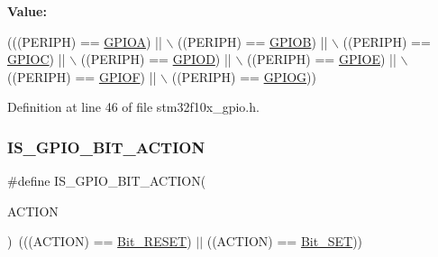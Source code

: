 {\bfseries Value\+:}
\begin{DoxyCode}
(((PERIPH) == \hyperlink{group___peripheral__declaration_gac485358099728ddae050db37924dd6b7}{GPIOA}) || \(\backslash\)
                                    ((PERIPH) == \hyperlink{group___peripheral__declaration_ga68b66ac73be4c836db878a42e1fea3cd}{GPIOB}) || \(\backslash\)
                                    ((PERIPH) == \hyperlink{group___peripheral__declaration_ga2dca03332d620196ba943bc2346eaa08}{GPIOC}) || \(\backslash\)
                                    ((PERIPH) == \hyperlink{group___peripheral__declaration_ga7580b1a929ea9df59725ba9c18eba6ac}{GPIOD}) || \(\backslash\)
                                    ((PERIPH) == \hyperlink{group___peripheral__declaration_gae04bdb5e8acc47cab1d0532e6b0d0763}{GPIOE}) || \(\backslash\)
                                    ((PERIPH) == \hyperlink{group___peripheral__declaration_ga43c3022dede7c9db7a58d3c3409dbc8d}{GPIOF}) || \(\backslash\)
                                    ((PERIPH) == \hyperlink{group___peripheral__declaration_ga02a2a23a32f9b02166a8c64012842414}{GPIOG}))
\end{DoxyCode}


Definition at line 46 of file stm32f10x\+\_\+gpio.\+h.

\mbox{\label{group___g_p_i_o___exported___types_ga6b882caa8ed9857c5c7267959a7818c5}} 
\subsubsection{\texorpdfstring{I\+S\+\_\+\+G\+P\+I\+O\+\_\+\+B\+I\+T\+\_\+\+A\+C\+T\+I\+ON}{IS\_GPIO\_BIT\_ACTION}}
{\footnotesize\ttfamily \#define I\+S\+\_\+\+G\+P\+I\+O\+\_\+\+B\+I\+T\+\_\+\+A\+C\+T\+I\+ON(\begin{DoxyParamCaption}\item[{}]{A\+C\+T\+I\+ON }\end{DoxyParamCaption})~(((A\+C\+T\+I\+ON) == \hyperlink{group___g_p_i_o___exported___types_gga176130b21c0e719121470a6042d4cf19ae2c026f2b44a949f82a65f3385edef09}{Bit\+\_\+\+R\+E\+S\+ET}) $\vert$$\vert$ ((A\+C\+T\+I\+ON) == \hyperlink{group___g_p_i_o___exported___types_gga176130b21c0e719121470a6042d4cf19a3c477841a6ceec13fe47ef322432b992}{Bit\+\_\+\+S\+ET}))}



